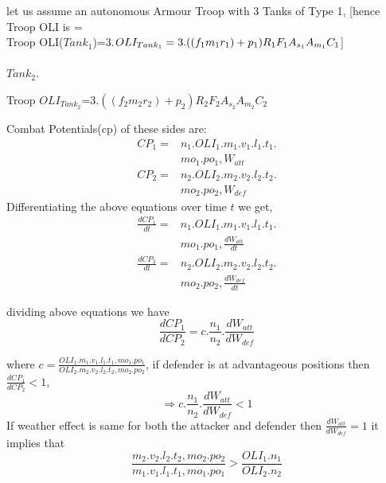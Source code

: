 \documentclass[]{article}
\begin{document}
   
    
    let us assume an autonomous Armour Troop with 3 Tanks of Type 1, [hence Troop OLI is =\\Troop OLI($Tank_1$)=3.$OLI_{ Tank_1}=\\3.((f_1m_1r_1)+p_1)R_1F_1A_{s_1}A_{m_1}C_1$]\\ \\ $Tank_2$.
    
    Troop $OLI_{Tank_2}$=$3.((f_2m_2r_2)+p_2)R_2F_2A_{s_2}A_{m_2}C_2$

    Combat Potentials(\acrshort{cp}) of these sides are:
    \begin{equation}
    \begin{split}
    CP_1=&n_1.OLI_1.m_1.v_1.l_1.t_1.\\&mo_1.po_1,W_{att}\\
    CP_2=&n_2.OLI_2.m_2.v_2.l_2.t_2.\\&mo_2.po_2,W_{def}
    \end{split}
  \end{equation}
Differentiating the above equations over time $t$ we get,
 \begin{equation}
 \begin{split}
  \frac{dCP_1}{dt}=&n_1.OLI_1.m_1.v_1.l_1.t_1.\\&mo_1.po_1,\frac{dW_{att}}{dt}\\
   \frac{dCP_2}{dt}=&n_2.OLI_2.m_2.v_2.l_2.t_2.\\&mo_2.po_2,\frac{dW_{def}}{dt}
 \end{split}
\end{equation}
 
dividing above equations we have
 \begin{equation}
    \frac{dCP_1}{dCP_2}=c.\frac{n_1}{n_2}.\frac{dW_{att}}{dW_{def}}
 \end{equation}
 
 where $c=\frac{OLI_1.m_1.v_1.l_1.t_1,mo_1.po_1}{OLI_2.m_2.v_2.l_2.t_2,mo_2.po_2}$,    if defender is at advantageous positions then $\frac{dCP_1}{dCP_2}<1$, 
 \begin{equation}
\Rightarrow 
          c.{\frac{n_1}{n_2}}.{\frac{dW_{att}}{dW_{def}}}<1
 \end{equation}
 If weather effect is same for both the attacker and defender then $\frac{dW_{att}}{dW_{def}}=1$ it implies that 
  \begin{equation}
    \frac{m_2.v_2.l_2.t_2,mo_2.po_2}{m_1.v_1.l_1.t_1,mo_1.po_1}>\frac{{OLI_1}.n_1}{{OLI_2}.n_2}
\end{equation}
\newpage
\end{document}
